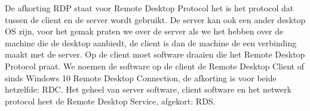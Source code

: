 De afkorting RDP staat voor Remote Desktop Protocol het is het protocol dat tussen de client en de server wordt gebruikt. De server kan ook een ander desktop OS zijn, voor het gemak praten we over de server als we het hebben over de machine die de desktop aanbiedt, de client is dan de machine de een verbinding maakt met de server. Op de client moet software draaien die het Remote Desktop Protocol praat. We noemen de software op de client de Remote Desktop Client of sinds Windows 10 Remote Desktop Connection, de afkorting is voor beide hetzelfde: RDC. Het geheel van server software, client software en het netwerk protocol heet de Remote Desktop Service, afgekort: RDS.

